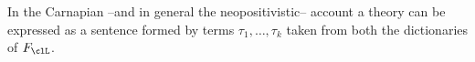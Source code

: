 In the Carnapian --and in general the neopositivistic-- account a theory can be expressed as a sentence formed by terms $\tau_1, \dots, \tau_k$ taken from both the dictionaries of $F_\clL$.

